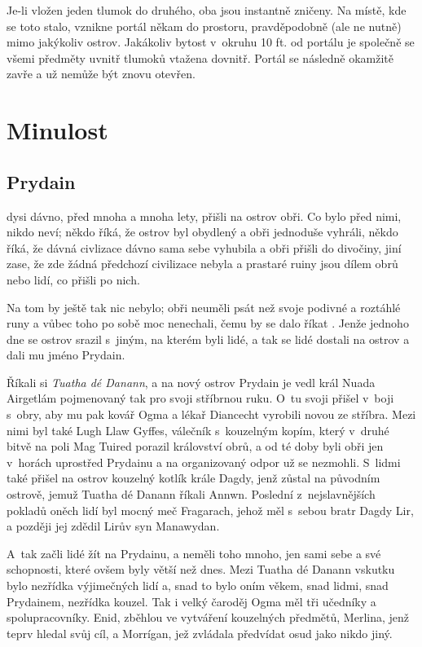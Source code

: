 \documentclass[a4paper,twocolumn,openany,nodeprecatedcode, justified]{dndbook}
\begin{document}
	Je-li vložen jeden tlumok do druhého, oba jsou instantně zničeny. Na místě, kde se toto stalo, vznikne portál někam do prostoru, pravděpodobně (ale ne nutně) mimo jakýkoliv ostrov. Jakákoliv bytost v~okruhu 10 ft. od portálu je společně se všemi předměty uvnitř tlumoků vtažena dovnitř. Portál se následně okamžitě zavře a už nemůže být znovu otevřen.
	

	
	
	
	\part{Minulost}
	
	\chapter{Prydain}
	
	dysi dávno, před mnoha a mnoha lety, přišli na ostrov obři. Co bylo před nimi, nikdo neví; někdo říká, že ostrov byl obydlený a obři jednoduše vyhráli, někdo říká, že dávná civlizace dávno sama sebe vyhubila a obři přišli do divočiny, jiní zase, že zde žádná předchozí civilizace nebyla a prastaré ruiny jsou dílem obrů nebo lidí, co přišli po nich.
	
	Na tom by ještě tak nic nebylo; obři neuměli psát než svoje podivné a roztáhlé runy a vůbec toho po sobě moc nenechali, čemu by se dalo říkat . Jenže jednoho dne se ostrov srazil s~jiným, na kterém byli lidé, a tak se lidé dostali na ostrov a dali mu jméno Prydain.
	
	Říkali si \emph{Tuatha dé Danann}, a na nový ostrov Prydain je vedl král Nuada Airgetlám pojmenovaný tak pro svoji stříbrnou ruku. O~tu svoji přišel v~boji s~obry, aby mu pak kovář Ogma a lékař Diancecht vyrobili novou ze stříbra. Mezi nimi byl také Lugh Llaw Gyffes, válečník s~kouzelným kopím, který v~druhé bitvě na poli Mag Tuired porazil království obrů, a od té doby byli obři jen v~horách uprostřed Prydainu a na organizovaný odpor už se nezmohli. S~lidmi také přišel na ostrov kouzelný kotlík krále Dagdy, jenž zůstal na původním ostrově, jemuž Tuatha dé Danann říkali Annwn. Poslední z~nejslavnějších pokladů oněch lidí byl mocný meč Fragarach, jehož měl s~sebou bratr Dagdy Lir, a později jej zdědil Lirův syn Manawydan.
	
	A~tak začli lidé žít na Prydainu, a neměli toho mnoho, jen sami sebe a své schopnosti, které ovšem byly větší než dnes. Mezi Tuatha dé Danann vskutku bylo nezřídka výjimečných lidí a, snad to bylo oním věkem, snad lidmi, snad Prydainem, nezřídka kouzel. Tak i velký čaroděj Ogma měl tři učedníky a spolupracovníky. Enid, zběhlou ve vytváření kouzelných předmětů, Merlina, jenž teprv hledal svůj cíl, a Morrígan, jež zvládala předvídat osud jako nikdo jiný.
	
\end{document}
